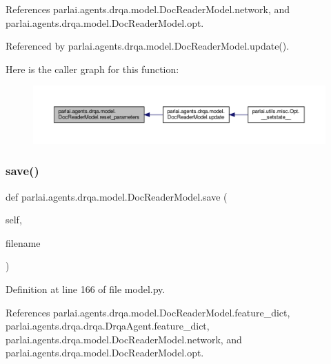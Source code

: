 References parlai.\+agents.\+drqa.\+model.\+Doc\+Reader\+Model.\+network, and parlai.\+agents.\+drqa.\+model.\+Doc\+Reader\+Model.\+opt.



Referenced by parlai.\+agents.\+drqa.\+model.\+Doc\+Reader\+Model.\+update().

Here is the caller graph for this function\+:
\nopagebreak
\begin{figure}[H]
\begin{center}
\leavevmode
\includegraphics[width=350pt]{classparlai_1_1agents_1_1drqa_1_1model_1_1DocReaderModel_ac509d418866e6d8bd2ad29eaf1152f52_icgraph}
\end{center}
\end{figure}
\mbox{\label{classparlai_1_1agents_1_1drqa_1_1model_1_1DocReaderModel_af50a0adfb1e85342655305813c814f86}} 
\subsubsection{\texorpdfstring{save()}{save()}}
{\footnotesize\ttfamily def parlai.\+agents.\+drqa.\+model.\+Doc\+Reader\+Model.\+save (\begin{DoxyParamCaption}\item[{}]{self,  }\item[{}]{filename }\end{DoxyParamCaption})}



Definition at line 166 of file model.\+py.



References parlai.\+agents.\+drqa.\+model.\+Doc\+Reader\+Model.\+feature\+\_\+dict, parlai.\+agents.\+drqa.\+drqa.\+Drqa\+Agent.\+feature\+\_\+dict, parlai.\+agents.\+drqa.\+model.\+Doc\+Reader\+Model.\+network, and parlai.\+agents.\+drqa.\+model.\+Doc\+Reader\+Model.\+opt.



